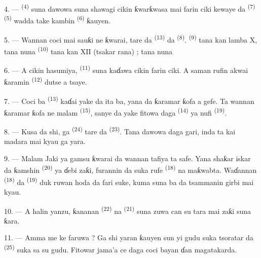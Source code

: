 4. ---  \textsuperscript{(4)} suna dawowa suna
shawagi cikin ƙwarƙwasa mai farin ciki kewaye da 
\textsuperscript{(7)}  \textsuperscript{(5)}
wadda take kambin  \textsuperscript{(6)} ƙauyen.

\VUsaut{3.4mm}
\VUsaut{3.0mm}

5. --- Wannan coci mai sauƙi ne ƙwarai, tare da  \textsuperscript{(13)} da 
\textsuperscript{(8)}.  \textsuperscript{(9)}
tana kan lamba X, tana nuna  
\textsuperscript{(10)} tana kan XII (tsakar rana) ; tana nuna

6. --- A cikin hasumiya,  \textsuperscript{(11)} suna
kaɗawa cikin farin ciki. A saman rufin akwai ƙaramin
 \textsuperscript{(12)} dutse a tsaye.

7. --- Coci ba  \textsuperscript{(13)} kaɗai yake
da ita ba, yana da ƙaramar ƙofa a gefe. Ta wannan ƙaramar ƙofa ne
malam  \textsuperscript{(15)}, sanye da  yake fitowa daga 
\textsuperscript{(14)} ya nufi 
\textsuperscript{(19)}.

8. --- Kusa da shi, ga 
\textsuperscript{(24)} tare da  \textsuperscript{(23)}.
Tana dawowa daga gari, inda ta kai madara mai kyau ga yara.

\VUsaut{4.0mm}
\VUsaut{3.4mm}

9. --- Malam Jaki ya gamsu ƙwarai da wannan tafiya ta safe. Yana
shaƙar iskar da ƙamshin  \textsuperscript{(20)} ya
ɗebi zaƙi, furannin da suka rufe 
\textsuperscript{(18)} na  maƙwabta. Waɗannan
 \textsuperscript{(18)} da  \textsuperscript{(19)} duk ruwan hoda da fari suke, kuma suna
ba da tsammanin girbi mai kyau.

10. --- A halin yanzu, ƙananan  \textsuperscript{(22)}
na  \textsuperscript{(21)} suna zuwa can su tara
 mai zaƙi suna ƙara.

11. --- Amma me ke faruwa ? Ga shi yaran ƙauyen sun yi gudu suka
tsoratar da  \textsuperscript{(25)} suka sa su
gudu. Fitowar jama’a ce daga coci bayan  ɗan
magatakarda.


